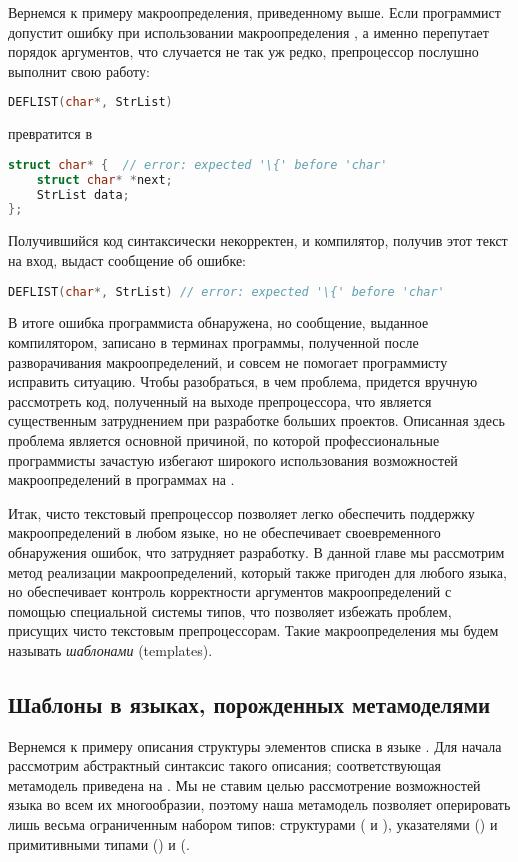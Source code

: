 Вернемся к примеру макроопределения, приведенному выше. Если программист допустит ошибку при использовании макроопределения , а именно перепутает порядок аргументов, что случается не так уж редко, препроцессор послушно выполнит свою работу:
\begin{lstlisting}[language=C]
DEFLIST(char*, StrList)
\end{lstlisting}
превратится в
\begin{lstlisting}[language=C]
struct char* {  // error: expected '\{' before 'char'
    struct char* *next; 
    StrList data; 
};
\end{lstlisting}
Получившийся код синтаксически некорректен, и компилятор, получив этот текст на вход, выдаст сообщение об ошибке:
\begin{lstlisting}[language=C]
DEFLIST(char*, StrList) // error: expected '\{' before 'char'
\end{lstlisting}
В итоге ошибка программиста обнаружена, но сообщение, выданное компилятором, записано в терминах программы, полученной после разворачивания макроопределений, и совсем не помогает программисту исправить ситуацию. Чтобы разобраться, в чем проблема, придется вручную рассмотреть код, полученный на выходе препроцессора, что является существенным затруднением при разработке больших проектов.
Описанная здесь проблема является основной причиной, по которой профессиональные программисты зачастую избегают широкого использования возможностей макроопределений в программах на  \cite{CodeComplete}. 

Итак, чисто текстовый препроцессор позволяет легко обеспечить поддержку макроопределений в любом языке, но не обеспечивает своевременного обнаружения ошибок, что затрудняет разработку. В данной главе мы рассмотрим метод реализации макроопределений, который также пригоден для любого языка, но обеспечивает контроль корректности аргументов макроопределений с помощью специальной системы типов, что позволяет избежать проблем, присущих чисто текстовым препроцессорам. Такие макроопределения мы будем называть \emph{шаблонами} (templates).

\subsection{Шаблоны в языках, порожденных метамоделями}

Вернемся к примеру описания структуры элементов списка в языке . Для начала рассмотрим абстрактный синтаксис такого описания; соответствующая метамодель приведена на . 
%
%
Мы не ставим целью рассмотрение возможностей языка  во всем их многообразии, поэтому наша метамодель позволяет оперировать лишь весьма ограниченным набором типов: структурами ( и ), указателями () и примитивными типами  () и  (.

